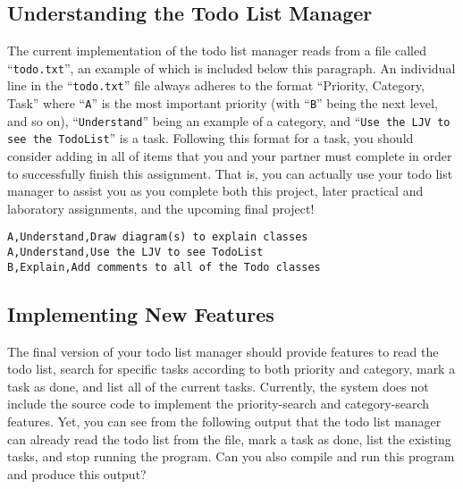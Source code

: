 \vspace{-0.1in}
\subsection*{Understanding the Todo List Manager}
\vspace{-0.05in}

The current implementation of the todo list manager reads from a file called ``{\tt todo.txt}'', an example of which is
included below this paragraph. An individual line in the ``{\tt todo.txt}'' file always adheres to the format
``Priority, Category, Task'' where ``{\tt A}'' is the most important priority (with ``{\tt B}'' being the next level,
and so on), ``{\tt Understand}'' being an example of a category, and ``{\tt Use the LJV to see the TodoList}'' is a
task.  Following this format for a task, you should consider adding in all of items that you and your partner must
complete in order to successfully finish this assignment. That is, you can actually use your todo list
manager to assist you as you complete both this project, later practical and laboratory assignments, and the upcoming
final project!

\vspace{-0.05in}
\begin{verbatim}
A,Understand,Draw diagram(s) to explain classes
A,Understand,Use the LJV to see TodoList
B,Explain,Add comments to all of the Todo classes
\end{verbatim}
\vspace{-0.05in}

\vspace{-0.15in}
\subsection*{Implementing New Features}
\vspace{-0.05in}

The final version of your todo list manager should provide features to read the todo list, search for specific tasks
according to both priority and category, mark a task as done, and list all of the current tasks.  Currently, the system
does not include the source code to implement the priority-search and category-search features. Yet, you can see
from the following output that the todo list manager can already read the todo list from the file, mark a task as done,
list the existing tasks, and stop running the program. Can you also compile and run this program and produce this
output?

